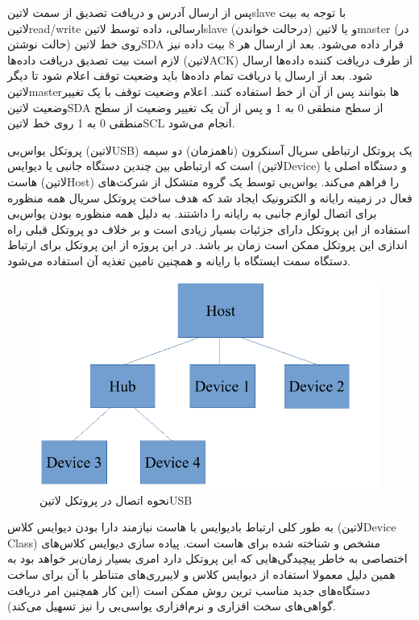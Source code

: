 پس از ارسال آدرس و دریافت تصدیق از سمت ‌لاتین{slave} با توجه به بیت ‌لاتین{read/write} ارسالی، داده توسط ‌لاتین{slave} (درحالت خواندن) و یا ‌لاتین{master} (در حالت نوشتن) روی خط ‌لاتین{SDA} قرار داده می‌شود. بعد از ارسال هر 8 بیت داده نیز لازم است بیت تصدیق دریافت داده‌ها (‌لاتین{ACK}) از طرف دریافت کننده داده‌ها ارسال شود. بعد از ارسال یا دریافت تمام داده‌ها باید وضعیت توقف اعلام شود تا دیگر ‌لاتین{master}ها بتوانند پس از آن از خط استفاده کنند. اعلام وضعیت توقف با یک تغییر وضعیت ‌لاتین{SDA} از سطح منطقی 0 به 1 و پس از آن یک تغییر وضعیت از سطح منطقی 0 به 1  روی خط ‌لاتین{SCL} انجام می‌شود.


پروتکل یو‌اس‌بی (‌لاتین{USB}) یک پروتکل ارتباطی سریال آسنکرون (نا‌همزمان) دو سیمه است که ارتباطی بین چندین دستگاه‌ جانبی یا دیوایس (‌لاتین{Device}) و دستگاه اصلی یا هاست (‌لاتین{Host}) را فراهم می‌کند. یواس‌بی توسط یک گروه متشکل از شرکت‌های فعال در زمینه رایانه و الکترونیک ایجاد شد که هدف ساخت پروتکل سریال همه منظوره برای اتصال لوازم جانبی به رایانه را داشتند. به دلیل همه منظوره بودن یو‌اس‌بی استفاده از این پروتکل دارای جزئیات بسیار زیادی است و بر خلاف دو پروتکل قبلی راه اندازی این پروتکل ممکن است زمان بر باشد. در این پروژه از این پروتکل برای ارتباط دستگاه سمت ایستگاه با رایانه و همچنین تامین تغذیه آن استفاده می‌شود.

\begin{figure}[!h]
	\centering
	\includegraphics[width=.7\linewidth]{Assets/USB.pdf}
	\caption{نحوه اتصال در پروتکل ‌لاتین{USB}}
	\label{fig:USBConnection}
\end{figure}

به طور کلی ارتباط بادیوایس با هاست نیازمند دارا بودن دیوایس کلاس (‌لاتین{Device Class}) مشخص و شناخته شده‌ برای هاست است. پیاده سازی دیوایس کلاس‌های اختصاصی به خاطر پیچیدگی‌هایی که این پروتکل دارد امری بسیار زمان‌بر خواهد بود به همین دلیل معمولا استفاده از دیوایس کلاس‌ و لایبرری‌های متناطر با آن برای ساخت دستگاه‌های جدید مناسب ترین روش ممکن است (این کار همچنین امر دریافت گواهی‌های سخت افزاری و نرم‌افزاری یو‌اسی‌بی را نیز تسهیل می‌کند).

